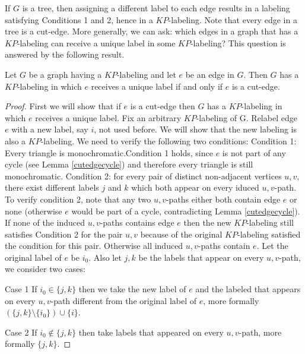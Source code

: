 \documentclass[12pt,a4paper,titlepage,openany]{report}
\begin{document}
If $G$ is a tree, then assigning a different label to each edge results in a labeling satisfying Conditions 1 and 2, hence in a $KP$-labeling. Note that every edge in a tree is a cut-edge. More generally, we can ask: which edges in a graph that has a $KP$-labeling can receive a unique label in some $KP$-labeling? This question is answered by the following result. 
\begin{proposition}
Let $G$ be a graph having a $KP$-labeling and let $e$ be an edge in $G$. Then $G$ has a $KP$-labeling in which $e$ receives a unique label if and only if $e$ is a cut-edge.
\end{proposition}

\begin{proof}
First we will show that if $e$ is a cut-edge then $G$ has a $KP$-labeling in which $e$ receives a unique label. Fix an arbitrary $KP$-labeling of G.\newline
Relabel edge $e$ with a new label, say $i$, not used before. We will show that the new labeling is also a $KP$-labeling. We need to verify the following two conditions:\newline
Condition 1: Every triangle is monochromatic.\newline Condition 1 holds, since $e$ is not part of any cycle (see Lemma \ref{cutedgecycle}) and therefore every triangle is still monochromatic.\newline
Condition 2: for every pair of distinct non-adjacent vertices $u,v$, there exist different labels $j$ and $k$ which both appear on every iduced $u,v$-path.\newline
To verify condition 2, note that any two $u,v$-paths either both contain edge $e$ or none (otherwise $e$ would be part of a cycle, contradicting Lemma \ref{cutedgecycle}).\newline
If none of the induced $u,v$-paths contains edge $e$ then the new $KP$-labeling still satisfies Condition 2 for the pair $u,v$ because of the original $KP$-labeling satisfied the condition for this pair.\newline
Otherwise all induced $u,v$-paths contain $e$. Let the original label of $e$ be $i_0$. Also let $j,k$ be the labels that appear on every $u,v$-path, we consider two cases:
\item[Case 1] If $i_0\in \{j,k\}$ then we take the new label of $e$ and the labeled that appears on every $u,v$-path different from the original label of $e$, more formally $(\{j,k\}\setminus \{i_0\})\cup \{i\}$.
\item[Case 2] If $i_0\not\in \{j,k\}$ then take labels that appeared on every $u,v$-path, more formally $\{j,k\}$.\newline

\end{proof}
\end{document}
